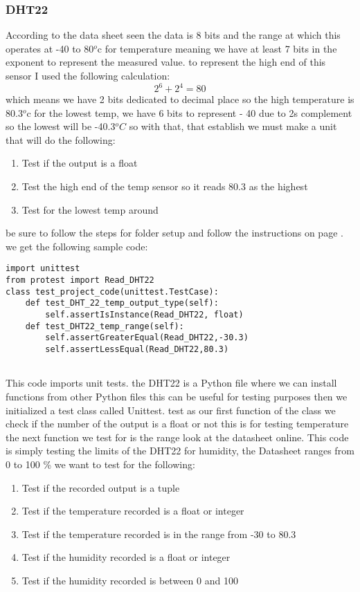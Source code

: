\subsubsection{DHT22}
According to the  data sheet \cite{sparkfun} seen the data is   8 bits  and  the  range at which this   operates at  -40 to 80$^{o}$c for temperature
meaning we have at least  7 bits in the exponent to represent the measured value.
to represent  the  high  end of this  sensor I used the  following calculation:
$$ 2^6 +2^4 = 80$$ which means we have 2 bits dedicated to decimal place so the  high temperature is 80.3$^{o}$c
for the  lowest temp, we have 6 bits  to  represent  - 40 due to  2s complement  so the lowest  will   be -40.3$^{o}C$
so with that, that  establish we  must  make a  unit  that will do  the  following:
\begin{enumerate}
    \item Test if the  output is  a float
    \item Test the  high end of  the  temp sensor so it  reads  80.3 as  the highest
    \item Test for the  lowest   temp   around 
\end{enumerate}
be sure to follow the steps for folder setup and follow the instructions on page \pageref{folderstructure}.
we get the following sample code:
\begin{lstlisting}[style=mystyle,caption={sample test intial code}]
import unittest
from protest import Read_DHT22
class test_project_code(unittest.TestCase):
    def test_DHT_22_temp_output_type(self):
        self.assertIsInstance(Read_DHT22, float)
    def test_DHT22_temp_range(self):
        self.assertGreaterEqual(Read_DHT22,-30.3)
        self.assertLessEqual(Read_DHT22,80.3)
    
\end{lstlisting} 
This code imports unit tests. the DHT22 is  a Python file where we can  install  functions from other Python files this can be useful for testing purposes
then we initialized a test class called Unittest. test as our first function of the class  we  check if the number of the output  is a float or not this is  for  testing  temperature
the next function we test for is the range look at the datasheet online. This code is  simply testing the  limits of the  DHT22
for  humidity, the Datasheet ranges from 0 to 100 \%
we want to test for the following:
\begin{enumerate}
    \item Test if the recorded output is a tuple
    \item Test if the temperature recorded  is a float or  integer
    \item Test if the temperature recorded is  in the  range from -30 to 80.3
    \item Test if the humidity recorded is  a  float or  integer
    \item Test if the humidity recorded is  between 0 and 100
\end{enumerate}
